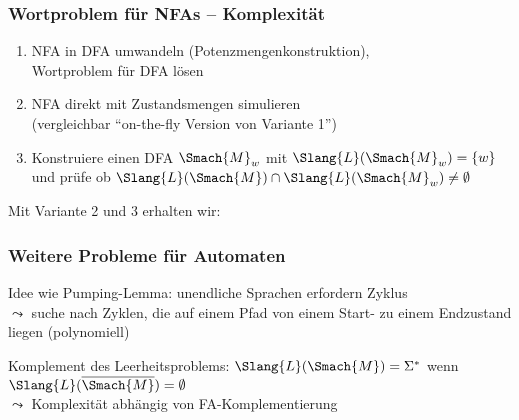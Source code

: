 \documentclass[aspectratio=1610,onlymath]{beamer}
\begin{document}
\begin{frame}[t]\frametitle{Wortproblem für NFAs -- Komplexität}

\begin{enumerate}[{Variante} 1:]
\item \alert{NFA in DFA umwandeln (Potenzmengenkonstruktion),\\ Wortproblem für DFA lösen}
\item \alert{NFA direkt mit Zustandsmengen simulieren\\ (vergleichbar "`on-the-fly Version von Variante 1"')}
\item \alert{Konstruiere einen DFA $\Smach{M}_w$ mit $\Slang{L}(\Smach{M}_w)=\{w\}$ und prüfe ob
$\Slang{L}(\Smach{M})\cap \Slang{L}(\Smach{M}_w) \neq\emptyset$}
\end{enumerate}

Mit Variante 2 und 3 erhalten wir:\medskip


\end{frame}

\begin{frame}\frametitle{Weitere Probleme für Automaten}


\pause

Idee wie Pumping-Lemma: unendliche Sprachen erfordern Zyklus\\
$\leadsto$ suche nach Zyklen, die auf einem Pfad von einem Start- zu einem Endzustand liegen (polynomiell)\pause

\pause

Komplement des Leerheitsproblems: $\Slang{L}(\Smach{M})=\Sigma^*$ wenn $\Slang{L}(\overline{\Smach{M}})=\emptyset$\\
$\leadsto$ Komplexität abhängig von FA-Komplementierung


\end{frame}
\end{document}

